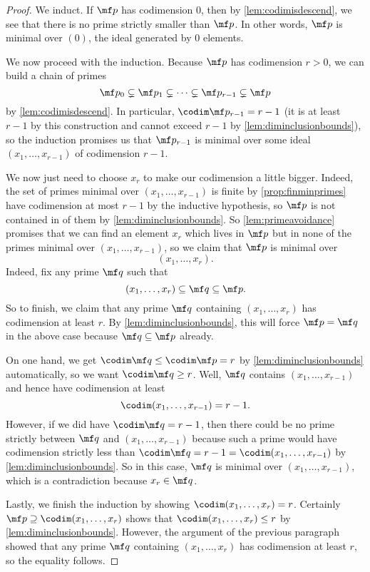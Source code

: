 \begin{proof}
	We induct. If $\mf p$ has codimension $0$, then by \autoref{lem:codimisdescend}, we see that there is no prime strictly smaller than $\mf p$. In other words, $\mf p$ is minimal over $(0)$, the ideal generated by $0$ elements.

	We now proceed with the induction. Because $\mf p$ has codimension $r>0$, we can build a chain of primes
	\[\mf p_0\subsetneq\mf p_1\subsetneq\cdots\subsetneq\mf p_{r-1}\subsetneq\mf p\]
	by \autoref{lem:codimisdescend}. In particular, $\codim\mf p_{r-1}=r-1$ (it is at least $r-1$ by this construction and cannot exceed $r-1$ by \autoref{lem:diminclusionbounds}), so the induction promises us that $\mf p_{r-1}$ is minimal over some ideal $(x_1,\ldots,x_{r-1})$ of codimension $r-1$.

	We now just need to choose $x_r$ to make our codimension a little bigger. Indeed, the set of primes minimal over $(x_1,\ldots,x_{r-1})$ is finite by \autoref{prop:finminprimes} have codimension at most $r-1$ by the inductive hypothesis, so $\mf p$ is not contained in of them by \autoref{lem:diminclusionbounds}. So \autoref{lem:primeavoidance} promises that we can find an element $x_r$ which lives in $\mf p$ but in none of the primes minimal over $(x_1,\ldots,x_{r-1})$, so we claim that $\mf p$ is minimal over
	\[(x_1,\ldots,x_r).\]
	Indeed, fix any prime $\mf q$ such that
	\[(x_1,\ldots,x_r)\subseteq\mf q\subseteq\mf p.\]
	So to finish, we claim that any prime $\mf q$ containing $(x_1,\ldots,x_r)$ has codimension at least $r$. By \autoref{lem:diminclusionbounds}, this will force $\mf p=\mf q$ in the above case because $\mf q\subseteq\mf p$ already.
	
	On one hand, we get $\codim\mf q\le\codim\mf p=r$ by \autoref{lem:diminclusionbounds} automatically, so we want $\codim\mf q\ge r$. Well, $\mf q$ contains $(x_1,\ldots,x_{r-1})$ and hence have codimension at least
	\[\codim(x_1,\ldots,x_{r-1})=r-1.\]
	However, if we did have $\codim\mf q=r-1$, then there could be no prime strictly between $\mf q$ and $(x_1,\ldots,x_{r-1})$ because such a prime would have codimension strictly less than $\codim\mf q=r-1=\codim(x_1,\ldots,x_{r-1})$ by \autoref{lem:diminclusionbounds}. So in this case, $\mf q$ is minimal over $(x_1,\ldots,x_{r-1})$, which is a contradiction because $x_r\in\mf q$.

	Lastly, we finish the induction by showing $\codim(x_1,\ldots,x_r)=r$. Certainly $\mf p\supseteq\codim(x_1,\ldots,x_r)$ shows that $\codim(x_1,\ldots,x_r)\le r$ by \autoref{lem:diminclusionbounds}. However, the argument of the previous paragraph showed that any prime $\mf q$ containing $(x_1,\ldots,x_r)$ has codimension at least $r$, so the equality follows.
\end{proof}